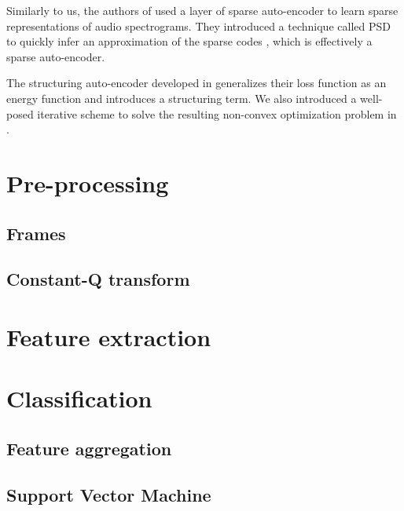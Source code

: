 Similarly to us, the authors of \cite{lecun2011PSDaudio} used a layer of sparse auto-encoder to learn sparse representations of audio spectrograms. They introduced a technique called \gls{PSD} to quickly infer an approximation of the sparse codes \cite{lecun2010PSD}, which is effectively a sparse auto-encoder.

The structuring auto-encoder developed in  generalizes their loss function as an energy function and introduces a structuring term. We also introduced a well-posed iterative scheme to solve the resulting non-convex optimization problem in .

\section{Pre-processing}

\subsection{Frames}

\subsection{Constant-Q transform}

\section{Feature extraction}

\section{Classification}

\subsection{Feature aggregation}

\subsection{Support Vector Machine}

